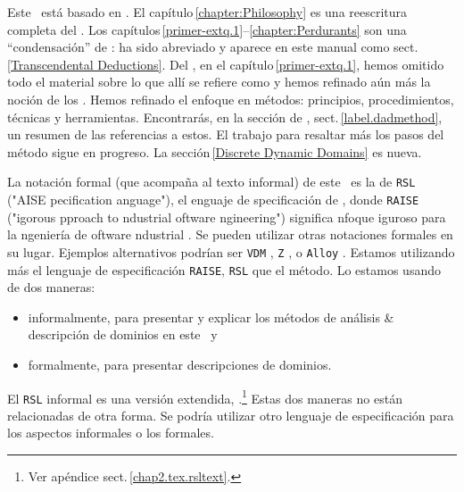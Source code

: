 \begynd
\pind Este \primer\ está basado en \cite[nov.\,2021]{BjornerMonograph2020}.
\pind El capítulo\,\ref{chapter:Philosophy} es una reescritura completa del
      \cite[capítulo\,2]{BjornerMonograph2020}.  
\pind Los capítulos\,\ref{primer-extq.1}--\ref{chapter:Perdurants} son una
      ``condensación'' de \cite[capítulos\,4--7]{BjornerMonograph2020}:
\begynd
\pind \cite[Capítulo\,6]{BjornerMonograph2020} ha sido abreviado y
      aparece en este manual como sect.\,\ref{Transcendental Deductions}.
\pind Del \cite[capítulo\,4]{BjornerMonograph2020}, en el
      capítulo\,\ref{primer-extq.1}, hemos omitido todo 
      el material sobre lo que allí se refiere como  
\pind y hemos refinado aún más la noción de los .
\afslut
\pind Hemos refinado el enfoque en métodos: principios, procedimientos,
      técnicas y herramientas.
\begynd
\pind Encontrarás, en la sección de ,
      sect.\,\vref{label.dadmethod}, un resumen de las referencias a estos.
\pind El trabajo para resaltar más los pasos del método sigue en progreso.
\afslut
\pind La sección\,\ref{Discrete Dynamic Domains} es nueva. 
\afslut

\label{RSL-I}

\begynd
\pind La notación formal (que acompaña al texto informal) de este
     \primer\ es la de \texttt{RSL} \cite{RSL} ("AISE pecification anguage"), el enguaje de
      specificación de , donde \texttt{RAISE} ("igorous pproach to ndustrial oftware ngineering")
      significa nfoque iguroso para la
      ngeniería de oftware ndustrial \cite{RaiseMethod}. 
\pind Se pueden utilizar otras notaciones formales en su lugar.
\pind Ejemplos alternativos podrían ser \texttt{VDM} \citevdm, \texttt{Z}
      \citez, o \texttt{Alloy} \citealloy.
\pind Estamos utilizando más el lenguaje de especificación \texttt{RAISE},
      \texttt{RSL} que el método.
\pind Lo estamos usando de dos maneras:
\begin{itemize}
\item informalmente, para presentar y explicar los métodos de análisis &
      descripción de dominios en este \primer\ y
\item formalmente, para presentar descripciones de dominios. 
\end{itemize}
\pind El \texttt{RSL} informal es una versión extendida,
\rslplus.\footnote{Ver apéndice sect.\,\vref{chap2.tex.rsltext}.}
\pind Estas dos maneras no están relacionadas de otra forma.
\pind Se podría utilizar otro lenguaje de especificación  para los
      aspectos informales o  los formales.
\afslut

